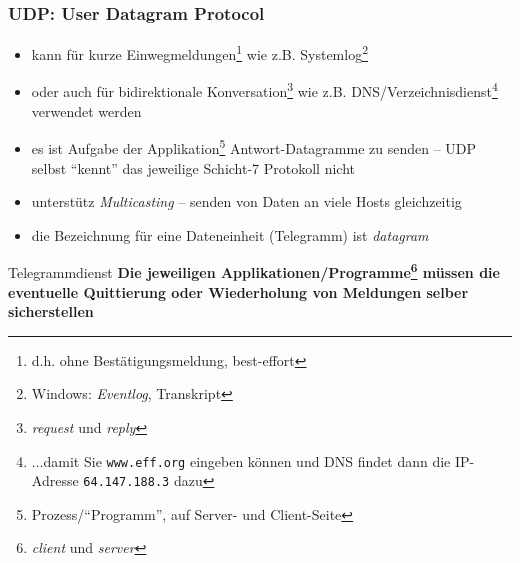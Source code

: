 \documentclass[ignorenonframetext]{beamer}
\begin{document}
\begin{frame}
\frametitle{UDP: User Datagram Protocol}
\begin{itemize}
	\item{kann f\"ur kurze Einwegmeldungen\footnote{d.h. ohne Best\"atigungsmeldung, best-effort} wie z.B. Systemlog\footnote{Windows: {\em Eventlog}, Transkript}}
	\item{oder auch f\"ur bidirektionale Konversation\footnote{{\em request} und {\em reply}} wie z.B. DNS/Verzeichnisdienst\footnote{$\ldots$damit Sie \texttt{www.eff.org} eingeben k\"onnen und DNS findet dann die IP-Adresse \texttt{64.147.188.3} dazu}}
	 verwendet werden
	 \item{es ist Aufgabe der Applikation\footnote{Prozess/``Programm'', auf Server- und Client-Seite} Antwort-Datagramme zu senden -- UDP selbst ``kennt'' das jeweilige Schicht-7 Protokoll nicht}
	 \item{unterst\"utz {\em Multicasting} -- senden von Daten an viele Hosts gleichzeitig}
	 \item{die Bezeichnung f\"ur eine Dateneinheit (Telegramm) ist {\em datagram}}
\end{itemize}
\begin{block}{Telegrammdienst}
\textbf{Die jeweiligen Applikationen/Programme\footnote{{\em client} und {\em server}} m\"ussen die eventuelle Quittierung oder Wiederholung von Meldungen selber sicherstellen}
\end{block}
\end{frame}
\end{document}
